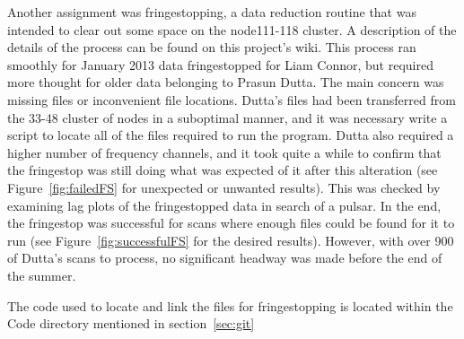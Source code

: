 \documentclass[a4paper,12pt]{article}
\begin{document}
Another assignment was fringestopping, a data reduction routine that was intended to clear out some space on the node111-118 cluster. A description of the details of the process can be found on this project's wiki. This process ran smoothly for January 2013 data fringestopped for Liam Connor, but required more thought for older data belonging to Prasun Dutta. The main concern was missing files or inconvenient file locations. Dutta’s files had been transferred from the 33-48 cluster of nodes in a suboptimal manner, and it was necessary write a script to locate all of the files required to run the program. Dutta also required a higher number of frequency channels, and it took quite a while to confirm that the fringestop was still doing what was expected of it after this alteration (see Figure~\ref{fig:failedFS} for unexpected or unwanted results). This was checked by examining lag plots of the fringestopped data in search of a pulsar. In the end, the fringestop was successful for scans where enough files could be found for it to run (see Figure~\ref{fig:successfulFS} for the desired results). However, with over 900 of Dutta’s scans to process, no significant headway was made before the end of the summer.

The code used to locate and link the files for fringestopping is located within the Code directory mentioned in section~\ref{sec:git}
\end{document}
